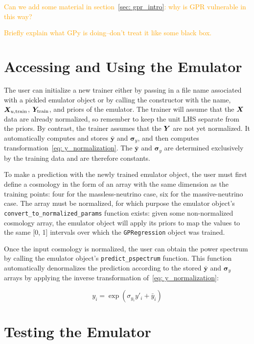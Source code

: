\textcolor{orange}{Can we add some material in
section~\ref{sec: gpr_intro}: why is GPR vulnerable in this way?}

\textcolor{orange}{Briefly explain what GPy is doing--don’t treat it like some 
black box.}


\section{Accessing and Using the Emulator}

The user can initialize a new trainer either by
passing in a file name associated with a pickled emulator object or by
calling the constructor with the name, $\bm{X}_{u, \text{train}}$,
$\bm{Y}_\text{train}$, and priors of the emulator. The trainer will assume
that the $\bm{X}$ data are already normalized, so remember to keep the unit
LHS separate from the priors. By contrast, the trainer assumes that the
$\bm{Y}$ are not yet normalized. It automatically computes and stores
$\bar{\bm{y}}$ and $\bm{\sigma}_y$, and then computes
transformation~\ref{eq: y_normalization}.
The $\bar{\bm{y}}$ and $\bm{\sigma}_y$ are determined exclusively by the
training data and are therefore constants.

To make a prediction with the newly trained emulator object, the user must
first define a cosmology in the form of an array with the same dimension as 
the training points: four for the massless-neutrino case, six for the
massive-neutrino case. The array must be normalized, for which purpose the
emulator object's \verb|convert_to_normalized_params| function exists:
given some non-normalized cosmology array, the emulator object will apply its
priors to map the values to the same [0, 1] intervals over which the
\texttt{GPRegression} object was trained.

Once the input cosmology is normalized, the user can obtain the power
spectrum by calling the emulator object's \verb|predict_pspectrum| function.
This function automatically denormalizes the prediction according to the
stored $\bar{\bm{y}}$ and $\bm{\sigma}_y$ arrays by applying the inverse
transformation of~\ref{eq: y_normalization}:

\begin{equation}
y_i = \exp (\sigma_{y_i} y'_i + \bar{y}_i)
\end{equation}


\section{Testing the Emulator}
\label{sec: test_emu}

